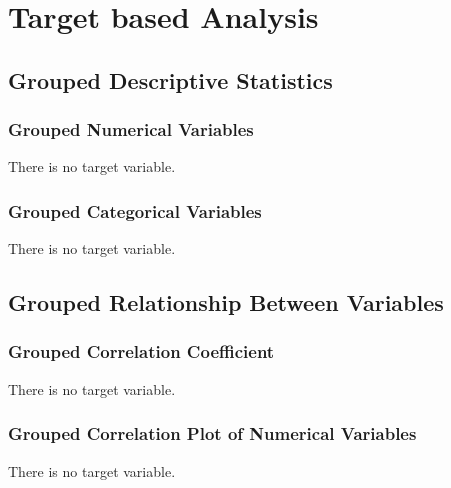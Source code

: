 \documentclass{book}\usepackage[]{graphicx}\usepackage[]{color}
\begin{document}
\chapter{Target based Analysis}
\section{Grouped Descriptive Statistics}
\subsection{Grouped Numerical Variables}

There is no target variable.



\subsection{Grouped Categorical Variables}

There is no target variable.



\section{Grouped Relationship Between Variables}
\subsection{Grouped Correlation Coefficient}
There is no target variable.



\subsection{Grouped Correlation Plot of Numerical Variables}
There is no target variable.
\end{document}
